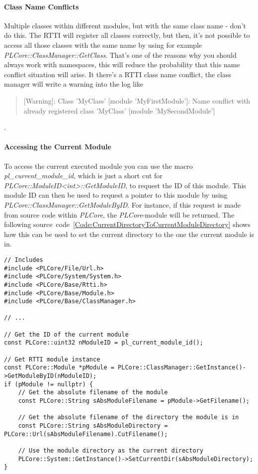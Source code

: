\paragraph{Class Name Conflicts}
Multiple classes within different modules, but with the same class name - don't do this. The \ac{RTTI} will register all classes correctly, but then, it's not possible to access all those classes with the same name by using for example \emph{PLCore::ClassManager::GetClass}. That's one of the reasons why you should always work with namespaces, this will reduce the probability that this name conflict situation will arise. It there's a \ac{RTTI} class name conflict, the class manager will write a warning into the log like
\begin{quote}[Warning]: Class 'MyClass' [module 'MyFirstModule']: Name conflict with already registered class 'MyClass' [module 'MySecondModule']\end{quote}.


\paragraph{Accessing the Current Module}
To access the current executed module you can use the macro \emph{pl\_current\_module\_id}, which is just a short cut for \emph{PLCore::ModuleID<int>::GetModuleID}, to request the ID of this module. This module ID can then be used to request a pointer to this module by using \emph{PLCore::ClassManager::GetModuleByID}. For instance, if this request is made from source code within \emph{PLCore}, the \emph{PLCore}-module will be returned. The following source~code~\ref{Code:CurrentDirectoryToCurrentModuleDirectory} shows how this can be used to set the current directory to the one the current module is in.
\begin{lstlisting}[label=Code:CurrentDirectoryToCurrentModuleDirectory,caption={Setting the current directory to the one the current module is in}]
// Includes
#include <PLCore/File/Url.h>
#include <PLCore/System/System.h>
#include <PLCore/Base/Rtti.h>
#include <PLCore/Base/Module.h>
#include <PLCore/Base/ClassManager.h>

// ...

// Get the ID of the current module
const PLCore::uint32 nModuleID = pl_current_module_id();

// Get RTTI module instance
const PLCore::Module *pModule = PLCore::ClassManager::GetInstance()->GetModuleByID(nModuleID);
if (pModule != nullptr) {
	// Get the absolute filename of the module
	const PLCore::String sAbsModuleFilename = pModule->GetFilename();

	// Get the absolute filename of the directory the module is in
	const PLCore::String sAbsModuleDirectory = PLCore::Url(sAbsModuleFilename).CutFilename();

	// Use the module directory as the current directory
	PLCore::System::GetInstance()->SetCurrentDir(sAbsModuleDirectory);
}
\end{lstlisting}




